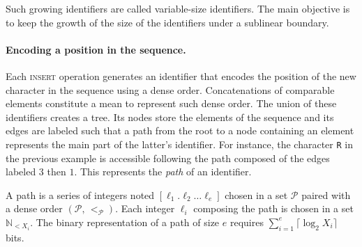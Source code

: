 
Such growing identifiers are called variable-size identifiers. The main
objective is to keep the growth of the size of the identifiers under a sublinear
boundary.

\paragraph{Encoding a position in the sequence.}
Each \textsc{insert} operation generates an identifier that encodes the position
of the new character in the sequence using a dense order. Concatenations of
comparable elements constitute a mean to represent such dense order.
The union of these identifiers creates a tree. Its nodes store the elements of
the sequence and its edges are labeled such that a path from the root to a node
containing an element represents the main part of the latter's identifier. For
instance, the character \texttt{R} in the previous example is accessible
following the path composed of the edges labeled $3$ then $1$.  This represents
the \emph{path} of an identifier.



\begin{definition}[Path]
  A path is a series of integers noted $[\ell_1.\ell_2\ldots \ell_e]$ chosen in a
  set $\mathcal{P}$ paired with a dense order $(\mathcal{P},\, <_\mathcal{P})$.
  Each integer $\ell_i$ composing the path is chosen in a set
  $\mathbb{N}_{<X_i}$. The binary representation of a path of size $e$ requires
  $\textstyle \sum\nolimits_{i=1}^e \lceil \log_2 X_i\rceil$ bits.
\end{definition}


